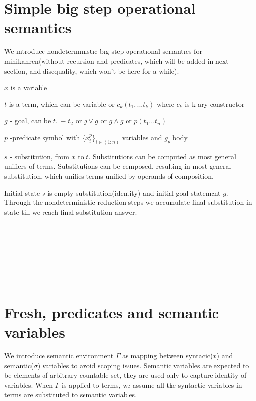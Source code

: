 \documentclass{article}
\begin{document}
\section{Simple big step operational semantics}

We introduce nondeterministic big-step operational semantics for minikanren(without recursion and predicates, which will be added in next section, and disequality, which won't be here for a while).

$ x $ is a variable

$ t $ is a term, which can be variable or $ c_k(t_1, ... t_k) $  where $ c_k $ is k-ary constructor

$ g $ - goal, can be $ t_1 \equiv t_2 $ or $ g \vee g $ or $ g \wedge g $ or $ p(t_1 ... t_n) $

$ p $ -predicate symbol with $ \{x^p_i\}_{i\in (1:n)} $ variables and $ g_p $ body

$ s $ - substitution, from $ x $ to $ t $. Substitutions can be computed as most general unifiers of terms. Substitutions can be composed, resulting in most general substitution, which unifies terms unified by operands of composition.

Initial state $ s $ is empty substitution(identity) and initial goal statement $g$. Through the nondeterministic reduction steps we accumulate final substitution in state till we reach final substitution-answer.

\ 


\ 



\ 


\ 


\newpage

\section{Fresh, predicates and semantic variables }

We introduce semantic environment $ \Gamma $ as mapping between syntacic($x$) and semantic($\sigma$) variables to avoid scoping issues. Semantic variables are expected to be elements of arbitrary countable set, they are used only to capture identity of variables. When $ \Gamma $ is applied to terms, we assume all the syntactic variables in terms are substituted to semantic variables.
\end{document}
